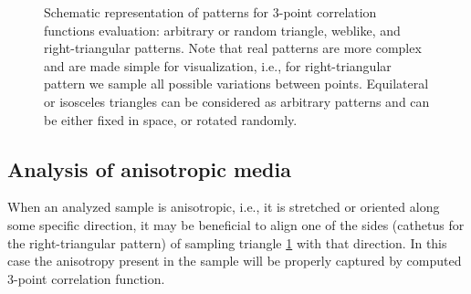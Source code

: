 \documentclass[reprint,amsmath,amssymb,aps,pre,showkeys,showpacs]{revtex4-1}
\begin{document}
\begin{figure}[ht]
  \centering
  \hfill
  \hfill
  \caption[]{Schematic representation of patterns for 3-point correlation
    functions evaluation: arbitrary or random triangle, weblike, and
    right-triangular patterns. Note that real patterns are more complex and are
    made simple for visualization, i.e., for right-triangular pattern we sample
    all possible variations between points. Equilateral or isosceles triangles
    can be considered as arbitrary patterns and can be either fixed in space, or
    rotated randomly.}
  \label{fig:pattern}
\end{figure}

\subsection{Analysis of anisotropic media}
When an analyzed sample is anisotropic, i.e., it is stretched or oriented along
some specific direction, it may be beneficial to align one of the sides
(cathetus for the right-triangular pattern) of sampling triangle
\cref{fig:pattern} with that direction. In this case the anisotropy present in
the sample will be properly captured by computed 3-point correlation function.
\end{document}

